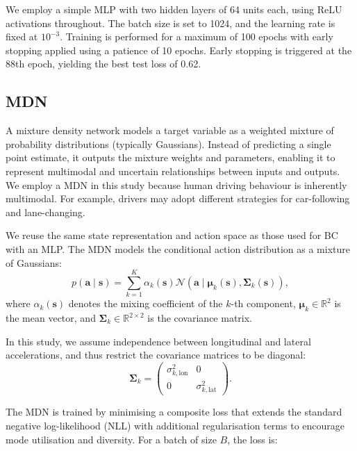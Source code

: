 \documentclass[journal]{IEEEtran}
\begin{document}
We employ a simple MLP with two hidden layers of 64 units each, using ReLU activations throughout. The batch size is set to 1024, and the learning rate is fixed at $10^{-3}$. Training is performed for a maximum of 100 epochs with early stopping applied using a patience of 10 epochs. Early stopping is triggered at the 88th epoch, yielding the best test loss of 0.62.

\subsection{MDN}\label{subsec:mdn-highway}
A mixture density network models a target variable as a weighted mixture of probability distributions (typically Gaussians). Instead of predicting a single point estimate, it outputs the mixture weights and parameters, enabling it to represent multimodal and uncertain relationships between inputs and outputs. We employ a MDN in this study because human driving behaviour is inherently multimodal. For example, drivers may adopt different strategies for car-following and lane-changing.

We reuse the same state representation and action space as those used for BC with an MLP. The MDN models the conditional action distribution as a mixture of Gaussians:
\begin{equation}
    p(\mathbf{a} \mid \mathbf{s}) = \sum_{k=1}^{K} \alpha_k(\mathbf{s}) 
    \mathcal{N}\!\left(\mathbf{a} \mid \boldsymbol{\mu}_k(\mathbf{s}), \boldsymbol{\Sigma}_k(\mathbf{s})\right),
\end{equation}
where $\alpha_k(\mathbf{s})$ denotes the mixing coefficient of the $k$-th component, $\boldsymbol{\mu}_k \in \mathbb{R}^2$ is the mean vector, and $\boldsymbol{\Sigma}_k \in \mathbb{R}^{2 \times 2}$ is the covariance matrix.

In this study, we assume independence between longitudinal and lateral accelerations, and thus restrict the covariance matrices to be diagonal:
\begin{equation}
    \boldsymbol{\Sigma}_k =
    \begin{pmatrix}
        \sigma_{k,\text{lon}}^2 & 0 \\
        0 & \sigma_{k,\text{lat}}^2
    \end{pmatrix}.
\end{equation}

The MDN is trained by minimising a composite loss that extends the standard negative log-likelihood (NLL) with additional regularisation terms to encourage mode utilisation and diversity. For a batch of size $B$, the loss is:
\end{document}
